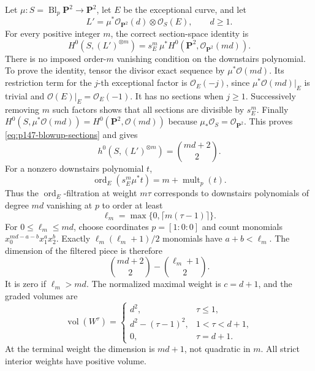 Let \(\mu:S=\operatorname{Bl}_p\mathbf P^2\to\mathbf P^2\),
let \(E\) be the exceptional curve, and let
\[
                  L'=\mu^*\mathcal O_{\mathbf P^2}(d)
                                       \otimes\mathcal O_S(E),\qquad d\geq1.
\]
For every positive integer \(m\), the correct section-space identity is
\begin{equation}\label{eq:p147-blowup-sections}
 H^0(S,(L')^{\otimes m})
       =s_E^m\,\mu^*H^0(\mathbf P^2,\mathcal O_{\mathbf P^2}(md)).
\end{equation}
There is no imposed order-\(m\) vanishing condition on the downstairs
polynomial.
To prove the identity, tensor the divisor exact sequence by
\(\mu^*\mathcal O(md)\).  Its restriction term for the \(j\)-th exceptional
factor is \(\mathcal O_E(-j)\), since
\(\mu^*\mathcal O(md)|_E\) is trivial and
\(\mathcal O(E)|_E=\mathcal O_E(-1)\).
It has no sections when \(j\geq1\).  Successively removing \(m\) such
factors shows that all sections are divisible by \(s_E^m\).
Finally \(H^0(S,\mu^*\mathcal O(md))=H^0(\mathbf P^2,\mathcal O(md))\)
because \(\mu_*\mathcal O_S=\mathcal O_{\mathbf P^2}\).
This proves \eqref{eq:p147-blowup-sections} and gives
\[
                     h^0(S,(L')^{\otimes m})=\binom{md+2}{2}.
\]
For a nonzero downstairs polynomial \(t\),
\[
            \operatorname{ord}_E(s_E^m\mu^*t)
                            =m+\operatorname{mult}_p(t).
\]
Thus the \(\operatorname{ord}_E\)-filtration at weight \(m\tau\)
corresponds to downstairs polynomials of degree \(md\) vanishing at \(p\)
to order at least
\[
                    \ell_m=\max\{0,\lceil m(\tau-1)\rceil\}.
\]
For \(0\leq\ell_m\leq md\), choose coordinates
\(p=[1:0:0]\) and count monomials
\(x_0^{md-a-b}x_1^a x_2^b\).
Exactly \(\ell_m(\ell_m+1)/2\) monomials have \(a+b<\ell_m\).
The dimension of the filtered piece is therefore
\[
                 \binom{md+2}{2}-\binom{\ell_m+1}{2}.
\]
It is zero if \(\ell_m>md\).
The normalized maximal weight is \(c=d+1\), and the graded volumes are
\begin{equation}\label{eq:p147-blowup-volumes}
 \operatorname{vol}(W^\tau)=
 \begin{cases}
 d^2,&\tau\leq1,\\
 d^2-(\tau-1)^2,&1<\tau<d+1,\\
 0,&\tau=d+1.
 \end{cases}
\end{equation}
At the terminal weight the dimension is \(md+1\), not quadratic in \(m\).
All strict interior weights have positive volume.

